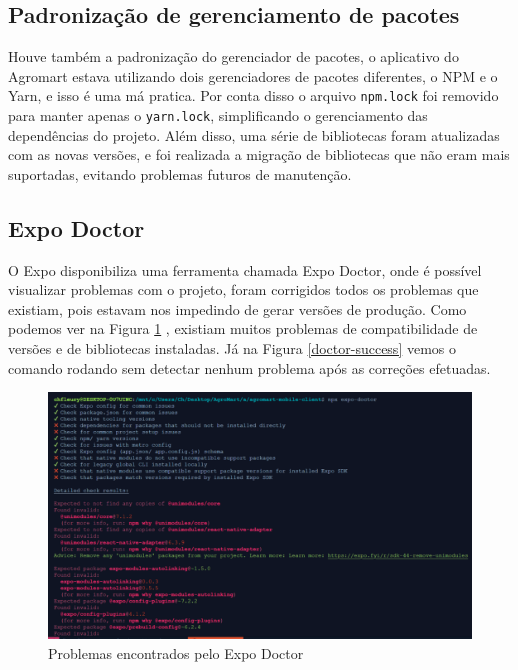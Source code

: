 \subsection{Padronização de gerenciamento de pacotes}

Houve também a padronização do gerenciador de pacotes, o aplicativo do Agromart estava utilizando dois gerenciadores de pacotes diferentes, o NPM e o Yarn, e isso é uma má pratica. Por conta disso o arquivo \texttt{npm.lock} foi removido para manter apenas o \texttt{yarn.lock}, simplificando o gerenciamento das dependências do projeto. Além disso, uma série de bibliotecas foram atualizadas com as novas versões, e foi realizada a migração de bibliotecas que não eram mais suportadas, evitando problemas futuros de manutenção.

\subsection{Expo Doctor}

O Expo disponibiliza uma ferramenta chamada Expo Doctor, onde é possível visualizar problemas com o projeto, foram corrigidos todos os problemas que existiam, pois estavam nos impedindo de gerar versões de produção. Como podemos ver na Figura \ref{doctor-fail} , existiam muitos problemas de compatibilidade de versões e de bibliotecas instaladas. Já na Figura \ref{doctor-success} vemos o comando rodando sem detectar nenhum problema após as correções efetuadas.

\begin{figure}[h]
	\centering
	\includegraphics[keepaspectratio=true,scale=0.5]{figuras/doctor-fail.png}
	\caption{Problemas encontrados pelo Expo Doctor}
	\label{doctor-fail}
\end{figure}

